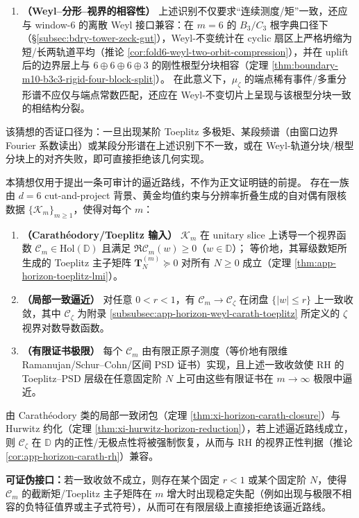 \begin{conjecture}
\begin{enumerate}
  \item \textbf{（Weyl--分形--视界的相容性）}
  上述识别不仅要求“连续测度/矩”一致，还应与 window-6 的离散 Weyl 接口兼容：在 \(m=6\) 的 \(B_3/C_3\) 根字典口径下（\S\ref{subsec:bdry-tower-zeck-gut}），Weyl-不变统计在 cyclic 扇区上严格坍缩为短/长两轨道平均（推论 \ref{cor:fold6-weyl-two-orbit-compression}），并在 uplift 后的边界层上与 \(6\oplus 6\oplus 6\oplus 3\) 的刚性根型分块相容（定理 \ref{thm:boundary-m10-b3c3-rigid-four-block-split}）。
  在此意义下，\(\mu_\zeta\) 的端点稀有事件/多重分形谱不应仅与端点常数匹配，还应在 Weyl-不变切片上呈现与该根型分块一致的相结构分裂。
\end{enumerate}
该猜想的否证口径为：一旦出现某阶 Toeplitz 多极矩、某段频谱（由窗口边界 Fourier 系数读出）或某段分形谱在上述识别下不一致，或在 Weyl-轨道分块/根型分块上的对齐失败，即可直接拒绝该几何实现。
\end{conjecture}

\begin{conjecture}\label{conj:discussion-kernel-zeta-toeplitz-convergence}
本猜想仅用于提出一条可审计的逼近路线，不作为正文证明链的前提。
存在一族由 \(d=6\) cut-and-project 背景、黄金均值约束与分辨率折叠生成的自对偶有限核数据 \(\{\mathcal{K}_m\}_{m\ge 1}\)，使得对每个 \(m\)：
\begin{enumerate}
  \item \textbf{（Carath\'eodory/Toeplitz 输入）}
  \(\mathcal{K}_m\) 在 unitary slice 上诱导一个视界函数 \(\mathscr{C}_m\in\mathrm{Hol}(\mathbb{D})\) 且满足 \(\Re\mathscr{C}_m(w)\ge 0\)（\(w\in\mathbb{D}\)）；
  等价地，其幂级数矩所生成的 Toeplitz 主子矩阵 \(\mathbf{T}^{(m)}_N\succeq 0\) 对所有 \(N\ge 0\) 成立（定理 \ref{thm:app-horizon-toeplitz-lmi}）。
  \item \textbf{（局部一致逼近）}
  对任意 \(0<r<1\)，有 \(\mathscr{C}_m\to \mathscr{C}_\zeta\) 在闭盘 \(\{|w|\le r\}\) 上一致收敛，其中 \(\mathscr{C}_\zeta\) 为附录 \ref{subsubsec:app-horizon-weyl-carath-toeplitz} 所定义的 \(\zeta\) 视界对数导数函数。
  \item \textbf{（有限证书极限）}
  每个 \(\mathscr{C}_m\) 由有限正原子测度（等价地有限维 Ramanujan/Schur--Cohn/区间 PSD 证书）实现，且上述一致收敛使 RH 的 Toeplitz--PSD 层级在任意固定阶 \(N\) 上可由这些有限证书在 \(m\to\infty\) 极限中逼近。
\end{enumerate}
由 Carath\'eodory 类的局部一致闭包（定理 \ref{thm:xi-horizon-carath-closure}）与 Hurwitz 约化（定理 \ref{thm:xi-hurwitz-horizon-reduction}），若上述逼近路线成立，则 \(\mathscr{C}_\zeta\) 在 \(\mathbb{D}\) 内的正性/无极点性将被强制恢复，从而与 RH 的视界正性判据（推论 \ref{cor:app-horizon-carath-rh}）兼容。
\par
\textbf{可证伪接口：}若一致收敛不成立，则存在某个固定 \(r<1\) 或某个固定阶 \(N\)，使得 \(\mathscr{C}_m\) 的截断矩/Toeplitz 主子矩阵在 \(m\) 增大时出现稳定失配（例如出现与极限不相容的负特征值界或主子式符号），从而可在有限层级上直接拒绝该逼近路线。
\end{conjecture}

